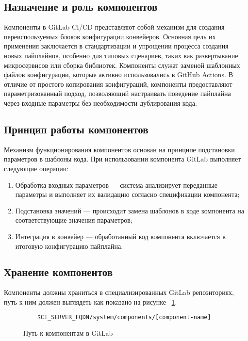\subsection{Назначение и роль компонентов} \label{subsec:components-role}
Компоненты в GitLab CI/CD\cite{gl-components} представляют собой механизм для создания переиспользуемых блоков конфигурации конвейеров.
Основная цель их применения заключается в стандартизации и упрощении процесса создания новых пайплайнов,
особенно для типовых сценариев, таких как развертывание микросервисов или сборка библиотек.
Компоненты служат заменой шаблонных файлов конфигурации, которые активно использовались в GitHub Actions.
В отличие от простого копирования конфигураций, компоненты предоставляют параметризованный подход,
позволяющий настраивать поведение пайплайна через входные параметры без необходимости дублирования кода.

\subsection{Принцип работы компонентов} \label{subsec:components-work-principals}
Механизм функционирования компонентов основан на принципе подстановки параметров в шаблоны кода.
При использовании компонента GitLab выполняет следующие операции:
\begin{enumerate}
  \item Обработка входных параметров — система анализирует переданные параметры и выполняет их валидацию согласно спецификации компонента;
  \item Подстановка значений — происходит замена шаблонов в коде компонента на соответствующие значения параметров;
  \item Интеграция в конвейер — обработанный код компонента включается в итоговую конфигурацию пайплайна.
\end{enumerate}

\subsection{Хранение компонентов} \label{subsec:components-storage}
Компоненты должны храниться в специализированных GitLab репозиториях, путь к ним должен выглядеть как показано на рисунке ~\ref{fig:component-path}.
\begin{figure}[h]
  \begin{verbatim}
    $CI_SERVER_FQDN/system/components/[component-name]
  \end{verbatim}
  \caption{Путь к компонентам в GitLab}
  \label{fig:component-path}
\end{figure}


